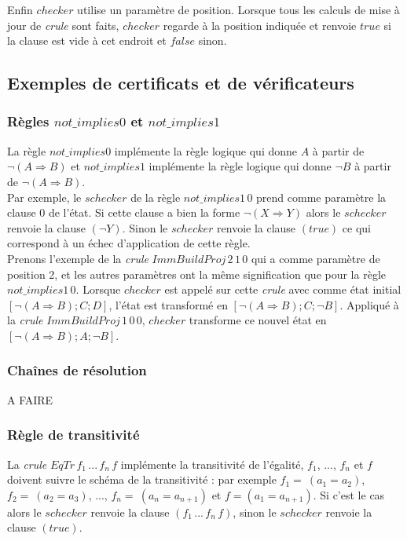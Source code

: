 \documentclass[11pt]{article}
\begin{document}
Enfin $checker$ utilise un paramètre de position. Lorsque tous les calculs de mise à jour de \textit{crule} sont faits, $checker$ regarde à la position indiquée et renvoie $true$ si la clause est vide à cet endroit et $false$ sinon.

\subsection{Exemples de certificats et de vérificateurs}

\subsubsection{Règles $not\_implies0$ et $not\_implies1$}
La règle $not\_implies0$ implémente la règle logique qui donne $A$ à partir de $\neg (A \Rightarrow B)$ et $not\_implies1$ implémente la règle logique qui donne $\neg B$ à partir de $\neg (A \Rightarrow B)$. \\

Par exemple, le $schecker$ de la règle $not\_implies1 \, 0$ prend comme paramètre la clause $0$ de l'état. Si cette clause a bien la forme $ \neg (X \Rightarrow Y)$ alors le $schecker$ renvoie la clause $(\neg Y)$. Sinon le $schecker$ renvoie la clause $(true)$ ce qui correspond à un échec d'application de cette règle. \\

Prenons l'exemple de la \textit{crule} $ImmBuildProj \, 2 \, 1 \, 0$ qui a comme paramètre de position 2, et les autres paramètres ont la même signification que pour la règle  $not\_implies1 \, 0$. Lorsque $checker$ est appelé sur cette \textit{crule} avec comme état initial  $[\neg (A \Rightarrow B);  C; D]$, l'état est transformé en $[\neg (A \Rightarrow B);  C; \neg B]$. Appliqué à la \textit{crule} $ImmBuildProj \, 1 \, 0 \, 0$, $checker$ transforme ce nouvel état en $[\neg (A \Rightarrow B);  A; \neg B]$. 

\subsubsection{Chaînes de résolution}

A FAIRE

\subsubsection{Règle de transitivité}

La \textit{crule} $EqTr\,f_1\,...\,f_n\,f$ implémente la transitivité de l'égalité, $f_1$, ..., $f_n$ et $f$ doivent suivre le schéma de la transitivité : par exemple $f_1 = ~(a_1=a_2)$, $f_2= ~(a_2=a_3)$, ..., $f_n=~(a_n=a_{n+1})$ et $f = (a_1 = a_{n+1})$. Si c'est le cas alors le $schecker$ renvoie la clause $(f_1\,...\,f_n\,f)$, sinon le $schecker$ renvoie la clause $(true)$.
\end{document}
